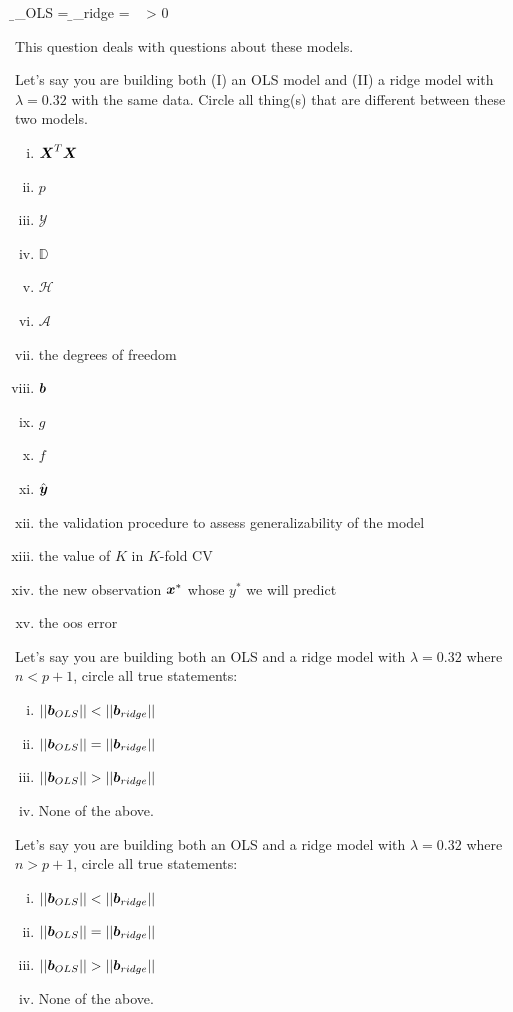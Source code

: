 \documentclass[12pt]{article}
\begin{document}
\beqn
\b_{OLS} = \XtXinv\Xt\y \quad\mathand\quad \b_{ridge} = \Xt\y \quad {}~ \lambda > 0
\eeqn

\noindent This question deals with questions about these models.

\benum

 Let's say you are building both (I) an OLS model and (II) a ridge model with $\lambda = 0.32$ with the same data. Circle all thing(s) that are different between these two models.


\begin{enumerate}[i)]
\item $\boldsymbol{X}^T\boldsymbol{X}$
\item $p$
\item $\mathcal{Y}$
\item $\mathbb{D}$
\item $\mathcal{H}$
\item $\mathcal{A}$
\item the degrees of freedom
\item $\boldsymbol{b}$
\item $g$
\item $f$
\item $\hat{\boldsymbol{y}}$
\item the validation procedure to assess generalizability of the model
\item the value of $K$ in $K$-fold CV
\item the new observation $\boldsymbol{x}^*$ whose $y^*$ we will predict
\item the oos error
\end{enumerate}


 Let's say you are building both an OLS and a ridge model with $\lambda = 0.32$ where $n < p + 1$, circle all true statements:

\begin{enumerate}[i)]
\item $\left|\left|\boldsymbol{b}_{OLS}\right|\right| < \left|\left|\boldsymbol{b}_{ridge}\right|\right|$
\item $\left|\left|\boldsymbol{b}_{OLS}\right|\right| = \left|\left|\boldsymbol{b}_{ridge}\right|\right|$
\item $\left|\left|\boldsymbol{b}_{OLS}\right|\right| > \left|\left|\boldsymbol{b}_{ridge}\right|\right|$
\item None of the above.
\end{enumerate}
\clearpage

 Let's say you are building both an OLS and a ridge model with $\lambda = 0.32$ where $n > p + 1$, circle all true statements:

\begin{enumerate}[i)]
\item $\left|\left|\boldsymbol{b}_{OLS}\right|\right| < \left|\left|\boldsymbol{b}_{ridge}\right|\right|$
\item $\left|\left|\boldsymbol{b}_{OLS}\right|\right| = \left|\left|\boldsymbol{b}_{ridge}\right|\right|$
\item $\left|\left|\boldsymbol{b}_{OLS}\right|\right| > \left|\left|\boldsymbol{b}_{ridge}\right|\right|$
\item None of the above.
\end{enumerate}
\end{document}
